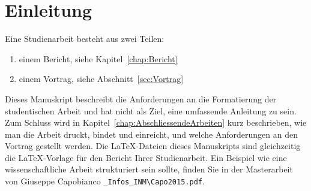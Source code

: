 \chapter{Einleitung}

Eine Studienarbeit besteht aus zwei Teilen:

\begin{enumerate}
	\item einem Bericht, siehe Kapitel~\ref{chap:Bericht}
	\item einem Vortrag, siehe Abschnitt~\ref{sec:Vortrag}
\end{enumerate}
Dieses Manuskript beschreibt die Anforderungen an die Formatierung der studentischen Arbeit und hat nicht als Ziel, eine umfassende Anleitung zu sein. Zum Schluss wird in Kapitel~\ref{chap:AbschliessendeArbeiten} kurz beschrieben, wie man die Arbeit druckt, bindet und einreicht, und welche Anforderungen an den Vortrag gestellt werden. Die \LaTeX-Dateien dieses Manuskripts sind gleichzeitig die \LaTeX-Vorlage für den Bericht Ihrer Studienarbeit. Ein Beispiel wie eine wissenschaftliche Arbeit strukturiert sein sollte, finden Sie in der Masterarbeit von Giuseppe Capobianco \verb"_Infos_INM\Capo2015.pdf".